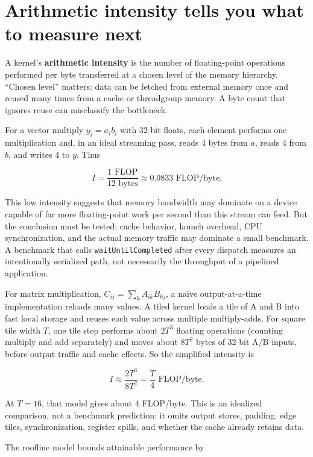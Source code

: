 \section{Arithmetic intensity tells you what to measure next}\label{01-foundations-i-ch011-arithmetic-intensity-tells-you-what-to-measure-next}

A kernel's \textbf{arithmetic intensity} is the number of floating-point operations performed per byte transferred at a chosen level of the memory hierarchy. ``Chosen level'' matters: data can be fetched from external memory once and reused many times from a cache or threadgroup memory. A byte count that ignores reuse can misclassify the bottleneck.

For a vector multiply \(y_i=a_i b_i\) with 32-bit floats, each element performs one multiplication and, in an ideal streaming pass, reads 4 bytes from \(a\), reads 4 from \(b\), and writes 4 to \(y\). Thus

\[
I=\frac{1\text{ FLOP}}{12\text{ bytes}}\approx0.0833\text{ FLOP/byte}.
\]

This low intensity suggests that memory bandwidth may dominate on a device capable of far more floating-point work per second than this stream can feed. But the conclusion must be tested: cache behavior, launch overhead, CPU synchronization, and the actual memory traffic may dominate a small benchmark. A benchmark that calls \texttt{waitUntilCompleted} after every dispatch measures an intentionally serialized path, not necessarily the throughput of a pipelined application.

For matrix multiplication, \(C_{ij}=\sum_k A_{ik}B_{kj}\), a naïve output-at-a-time implementation reloads many values. A tiled kernel loads a tile of A and B into fast local storage and reuses each value across multiple multiply-adds. For square tile width \(T\), one tile step performs about \(2T^3\) floating operations (counting multiply and add separately) and moves about \(8T^2\) bytes of 32-bit A/B inputs, before output traffic and cache effects. So the simplified intensity is

\[
I\approx\frac{2T^3}{8T^2}=\frac{T}{4}\text{ FLOP/byte}.
\]

At \(T=16\), that model gives about 4 FLOP/byte. This is an idealized comparison, not a benchmark prediction: it omits output stores, padding, edge tiles, synchronization, register spills, and whether the cache already retains data.

The roofline model bounds attainable performance by

